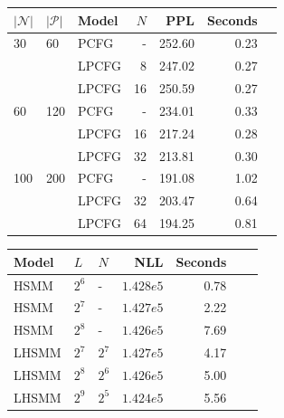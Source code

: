 \documentclass{article}
\begin{document}
\begin{table}[!t]
\centering
\begin{tabular} {lllrrrr}
\toprule
$|\mathcal{N}|$ & $|\mathcal{P}|$ & Model & $N$ &  PPL & Seconds\\ %
\midrule
30  & 60    & PCFG & - & 252.60 &  0.23\\  %
    &       & LPCFG & 8 &  247.02    & 0.27\\ %
    &       & LPCFG & 16 & 250.59    & 0.27\\ %
\midrule
60  & 120   & PCFG & - & 234.01 &  0.33\\ %
    &       & LPCFG & 16& 217.24 & 0.28\\ %
    &       & LPCFG & 32& 213.81 & 0.30\\ %
\midrule
100 & 200   & PCFG & - &  191.08   & 1.02\\ %
    &       & LPCFG & 32& 203.47 & 0.64\\ %
    &       & LPCFG & 64& 194.25 & 0.81\\ %
\bottomrule
\end{tabular}
\vspace{0em}
\hfill
\begin{tabular} {lllrrrr}
\toprule
Model & $L$ & $N$ & NLL & Seconds \\ %
\midrule
HSMM & $2^6$ & - & $1.428e5$ & 0.78\\ %
HSMM & $2^7$ & - & $1.427e5$  & 2.22\\ %
HSMM & $2^8$ & - & $1.426e5$ & 7.69\\ %
\midrule
LHSMM & $2^7$ & $2^7$ & $1.427e5$ & 4.17\\ %
LHSMM & $2^8$ & $2^6$ & $1.426e5$ & 5.00\\ %
LHSMM & $2^9$ & $2^5$ & $1.424e5$ & 5.56\\ %

\end{tabular}
\end{table}
\end{document}
